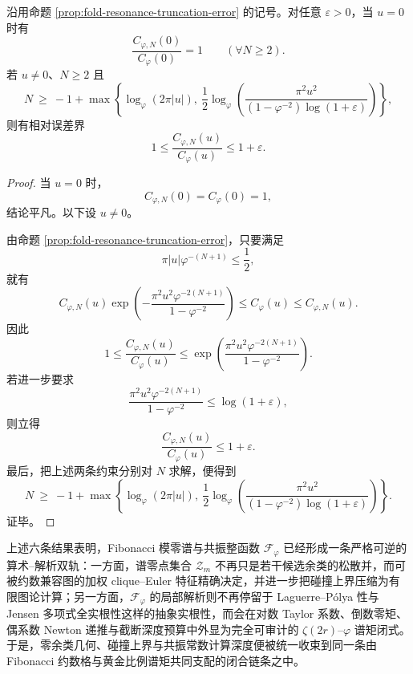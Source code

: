 \begin{corollary}[共振梯截断深度的相对误差预算]\label{cor:xi-time-part71-resonance-truncation-relative-error-budget}
沿用命题 \ref{prop:fold-resonance-truncation-error} 的记号。对任意 \(\varepsilon>0\)，当 \(u=0\) 时有
\[
\frac{C_{\varphi,N}(0)}{C_\varphi(0)}=1
\qquad
(\forall N\ge 2).
\]
若 \(u\neq 0\)、\(N\ge 2\) 且
\[
N\ \ge\
-1+\max\!\left\{
\log_\varphi(2\pi|u|),\
\frac12\log_\varphi\!\left(
\frac{\pi^2u^2}{(1-\varphi^{-2})\log(1+\varepsilon)}
\right)
\right\},
\]
则有相对误差界
\[
1\le \frac{C_{\varphi,N}(u)}{C_\varphi(u)}\le 1+\varepsilon.
\]
\end{corollary}
\begin{proof}
当 \(u=0\) 时，
\[
C_{\varphi,N}(0)=C_\varphi(0)=1,
\]
结论平凡。以下设 \(u\neq 0\)。

由命题 \ref{prop:fold-resonance-truncation-error}，只要满足
\[
\pi|u|\varphi^{-(N+1)}\le \frac12,
\]
就有
\[
C_{\varphi,N}(u)\exp\!\left(
-\frac{\pi^2u^2\varphi^{-2(N+1)}}{1-\varphi^{-2}}
\right)
\le
C_\varphi(u)
\le
C_{\varphi,N}(u).
\]
因此
\[
1
\le
\frac{C_{\varphi,N}(u)}{C_\varphi(u)}
\le
\exp\!\left(
\frac{\pi^2u^2\varphi^{-2(N+1)}}{1-\varphi^{-2}}
\right).
\]
若进一步要求
\[
\frac{\pi^2u^2\varphi^{-2(N+1)}}{1-\varphi^{-2}}
\le
\log(1+\varepsilon),
\]
则立得
\[
\frac{C_{\varphi,N}(u)}{C_\varphi(u)}\le 1+\varepsilon.
\]
最后，把上述两条约束分别对 \(N\) 求解，便得到
\[
N\ \ge\
-1+\max\!\left\{
\log_\varphi(2\pi|u|),\
\frac12\log_\varphi\!\left(
\frac{\pi^2u^2}{(1-\varphi^{-2})\log(1+\varepsilon)}
\right)
\right\}.
\]
证毕。
\end{proof}

\noindent
上述六条结果表明，Fibonacci 模零谱与共振整函数 \(\mathcal F_\varphi\) 已经形成一条严格可逆的算术--解析双轨：一方面，谱零点集合 \(\mathcal Z_m\) 不再只是若干候选余类的松散并，而可被约数兼容图的加权 clique--Euler 特征精确决定，并进一步把碰撞上界压缩为有限图论计算；另一方面，\(\mathcal F_\varphi\) 的局部解析则不再停留于 Laguerre--P\'olya 性与 Jensen 多项式全实根性这样的抽象实根性，而会在对数 Taylor 系数、倒数零矩、偶系数 Newton 递推与截断深度预算中外显为完全可审计的 \(\zeta(2r)\)--\(\varphi\) 谱矩闭式。于是，零余类几何、碰撞上界与共振常数计算深度便被统一收束到同一条由 Fibonacci 约数格与黄金比例谱矩共同支配的闭合链条之中。



\endinput
